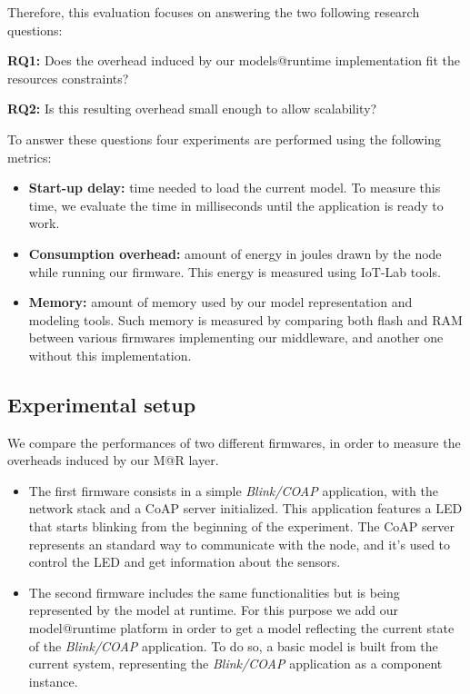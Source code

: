 Therefore, this evaluation focuses on answering the two following research questions:

\textbf{RQ1:} Does the overhead induced by our models@runtime implementation fit the resources constraints?

\textbf{RQ2:} Is this resulting overhead small enough to allow scalability?


To answer these questions four experiments are performed using the following metrics:
\begin{itemize}
	\item \textbf{Start-up delay:} time needed to load the current model. To measure this time, we evaluate the time in milliseconds until the application is ready to work.
	\item \textbf{Consumption overhead:} amount of energy in joules drawn by the node while running our firmware.
	This energy is measured using IoT-Lab tools. 
	\item \textbf{Memory:} amount of memory used by our model representation and modeling tools.
	Such memory is measured by comparing both flash and RAM between various firmwares implementing our middleware, and another one without this implementation.
\end{itemize}

\subsection{Experimental setup}
We compare the performances of two different firmwares, in order to measure the overheads induced by our M@R layer.


\begin{itemize}
	\item The first firmware consists in a simple \emph{Blink/COAP} application, with the network stack and a CoAP server initialized.
	This application features a LED that starts blinking from the beginning of the experiment. The CoAP server represents an standard way to communicate with the node, and it's used to control the LED and get information about the sensors.
	\item The second firmware includes the same functionalities but is being represented by the model at runtime. For this purpose we add our model@runtime platform in order to get a model reflecting the current state of the \emph{Blink/COAP} application.
	To do so, a basic model is built from the current system, representing the \emph{Blink/COAP} application as a component instance.
\end{itemize}


